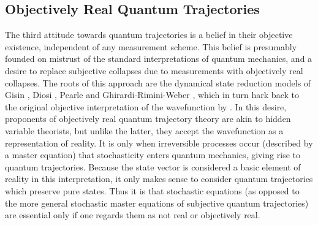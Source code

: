 \subsection{Objectively Real Quantum Trajectories}

The third attitude towards quantum trajectories is a belief in their 
objective existence, independent of any measurement scheme. This belief 
is presumably founded on mistrust of the standard interpretations of 
quantum mechanics, and a desire to replace subjective collapses due to 
measurements with objectively real collapses. The roots of this approach 
are the dynamical state reduction models of Gisin \cite{Gis89}, 
Diosi \cite{Dio88}, Pearle \cite{Pea89} and Ghirardi-Rimini-Weber \cite{GRW},
which in turn hark back to the original objective interpretation of the 
wavefunction by \sch \cite{Roh87}. In this desire, proponents of objectively 
real quantum trajectory theory are akin to hidden variable theorists, but 
unlike the latter, they accept the wavefunction as a 
representation of reality. It is only when irreversible processes occur 
(described by a master equation) that stochasticity enters quantum 
mechanics, giving rise to quantum trajectories. Because the state vector is considered
a basic element of reality in this  interpretation, it only makes sense to consider
quantum trajectories  which preserve pure states. Thus it is that stochastic \sch
equations (as opposed to the more general stochastic master equations of subjective
quantum trajectories) are essential only if one regards them as not real or
objectively  real.

